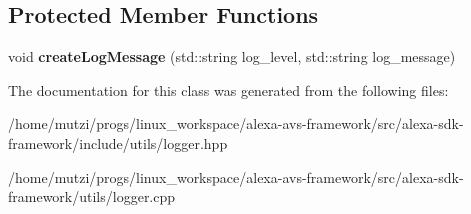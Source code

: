 \subsection*{Protected Member Functions}
\begin{DoxyCompactItemize}
\item 
\mbox{\label{classAVS_1_1Logger_af9a71b2b0394138d3cd73970e5302e06}} 
void {\bfseries create\+Log\+Message} (std\+::string log\+\_\+level, std\+::string log\+\_\+message)
\end{DoxyCompactItemize}


The documentation for this class was generated from the following files\+:\begin{DoxyCompactItemize}
\item 
/home/mutzi/progs/linux\+\_\+workspace/alexa-\/avs-\/framework/src/alexa-\/sdk-\/framework/include/utils/logger.\+hpp\item 
/home/mutzi/progs/linux\+\_\+workspace/alexa-\/avs-\/framework/src/alexa-\/sdk-\/framework/utils/logger.\+cpp\end{DoxyCompactItemize}
